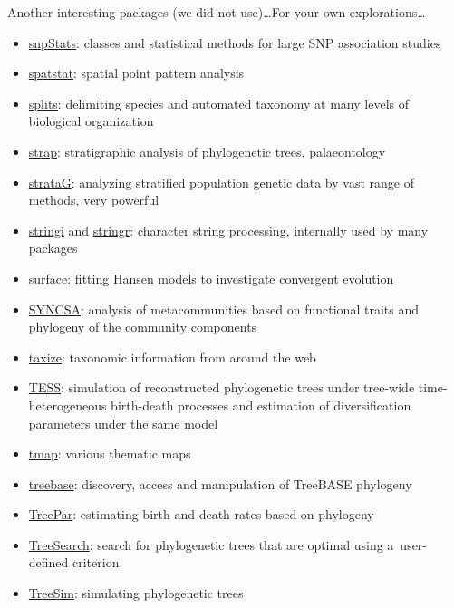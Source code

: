 \documentclass[compress, ucs, xelatex, 11pt, xcolor=svgnames, aspectratio=169,
	hyperref={
		bookmarks=true,
		unicode=true,
		colorlinks=true,
		pdftitle={Molecular data in R},
		plainpages=false,
		pdfauthor={Vojtech Zeisek},
		pdfsubject={Course about phylogeny and evolution in R},
		pdfcreator={XeLaTeX},
		pdfkeywords={R, evolution, phylogeny, molecular data},
		linkcolor=Crimson, %
		anchorcolor=Magenta, %
		citecolor=Magenta, %
		filecolor=Magenta, %
		menucolor=Magenta, %
		urlcolor=DodgerBlue, %
		pdftex},
	url={hyphens, lowtilde} %
	]{beamer}
\begin{document}
\begin{frame}[allowframebreaks]{Another interesting packages (we did not use)\ldots}{For your own explorations\ldots}
\begin{itemize}
		\item \href{https://bioconductor.org/packages/release/bioc/html/snpStats.html}{snpStats}: classes and statistical methods for large SNP association studies
		\item \href{https://CRAN.R-project.org/package=spatstat}{spatstat}: spatial point pattern analysis
		\item \href{https://r-forge.r-project.org/projects/splits/}{splits}: delimiting species and automated taxonomy at many levels of biological organization
		\item \href{https://CRAN.R-project.org/package=strap}{strap}: stratigraphic analysis of phylogenetic trees, palaeontology
		\item \href{https://CRAN.R-project.org/package=strataG}{strataG}: analyzing stratified population genetic data by vast range of methods, very powerful
		\item \href{https://CRAN.R-project.org/package=stringi}{stringi} and \href{https://CRAN.R-project.org/package=stringr}{stringr}: character string processing, internally used by many packages
		\item \href{https://CRAN.R-project.org/package=surface}{surface}: fitting Hansen models to investigate convergent evolution
		\item \href{https://CRAN.R-project.org/package=SYNCSA}{SYNCSA}: analysis of metacommunities based on functional traits and phylogeny of the community components
		\item \href{https://CRAN.R-project.org/package=taxize}{taxize}: taxonomic information from around the web
		\item \href{https://CRAN.R-project.org/package=TESS}{TESS}: simulation of reconstructed phylogenetic trees under tree-wide time-heterogeneous birth-death processes and estimation of diversification parameters under the same model
		\item \href{https://CRAN.R-project.org/package=tmap}{tmap}: various thematic maps
		\item \href{https://CRAN.R-project.org/package=treebase}{treebase}:  discovery, access and manipulation of TreeBASE phylogeny
		\item \href{https://CRAN.R-project.org/package=TreePar}{TreePar}: estimating birth and death rates based on phylogeny
		\item \href{https://CRAN.R-project.org/package=TreeSearch}{TreeSearch}: search for phylogenetic trees that are optimal using a~user-defined criterion
		\item \href{https://CRAN.R-project.org/package=TreeSim}{TreeSim}: simulating phylogenetic trees

\end{itemize}
\end{frame}
\end{document}
